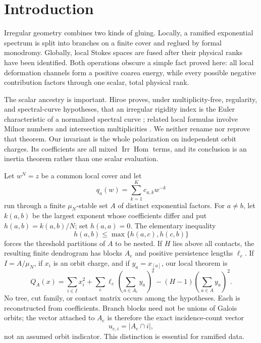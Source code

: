 \documentclass[11pt,a4paper]{amsart}
\theoremstyle{plain}
\theoremstyle{definition}
\newcommand{\Irr}{\operatorname{Irr}}
\newcommand{\Hom}{\operatorname{Hom}}
\begin{document}
\section{Introduction}

Irregular geometry combines two kinds of gluing.  Locally, a ramified exponential spectrum is
split into branches on a finite cover and reglued by formal monodromy.  Globally, local Stokes
spaces are fused after their physical ranks have been identified.  Both operations obscure a
simple fact proved here: all local deformation channels form a positive coarea energy, while every
possible negative contribution factors through one scalar, total physical rank.

The scalar ancestry is important.  Hiroe proves, under multiplicity-free, regularity, and
spectral-curve hypotheses, that an irregular rigidity index is the Euler characteristic of a
normalized spectral curve \cite{Hiroe2019}; related local formulas involve Milnor numbers and
intersection multiplicities \cite{Hiroe2017}.  We neither rename nor reprove that theorem.  Our
invariant is the whole polarization on independent orbit charges.  Its coefficients are all mixed
$\Irr\Hom$ terms, and its conclusion is an inertia theorem rather than one scalar evaluation.

Let $w^N=z$ be a common local cover and let
\[
                     q_a(w)=\sum_{k=1}^{K}c_{a,k}w^{-k}
\]
run through a finite $\mu_N$-stable set $A$ of distinct exponential factors.  For $a\ne b$, let
$k(a,b)$ be the largest exponent whose coefficients differ and put $h(a,b)=k(a,b)/N$; set
$h(a,a)=0$.  The elementary inequality
\[
                     h(a,b)\leq\max\{h(a,c),h(c,b)\}
\]
forces the threshold partitions of $A$ to be nested.  If $H$ lies above all contacts, the resulting
finite dendrogram has blocks $A_e$ and positive persistence lengths $\ell_e$.  If
$I=A/\mu_N$, if $x_i$ is an orbit charge, and if $y_a=x_{[a]}$, our local theorem is
\begin{equation}\label{eq:introduction-law}
 \boxed{
 Q_A(x)=\sum_{i\in I}x_i^2+
        \sum_e\ell_e\left(\sum_{a\in A_e}y_a\right)^2
        -(H-1)\left(\sum_{a\in A}y_a\right)^2.}              \tag{W}
\end{equation}
No tree, cut family, or contact matrix occurs among the hypotheses.  Each is reconstructed from
coefficients.  Branch blocks need not be unions of Galois orbits; the vector attached to $A_e$ is
therefore the exact incidence-count vector
\[
                       u_{e,i}=|A_e\cap i|,
\]
not an assumed orbit indicator.  This distinction is essential for ramified data.
\end{document}
